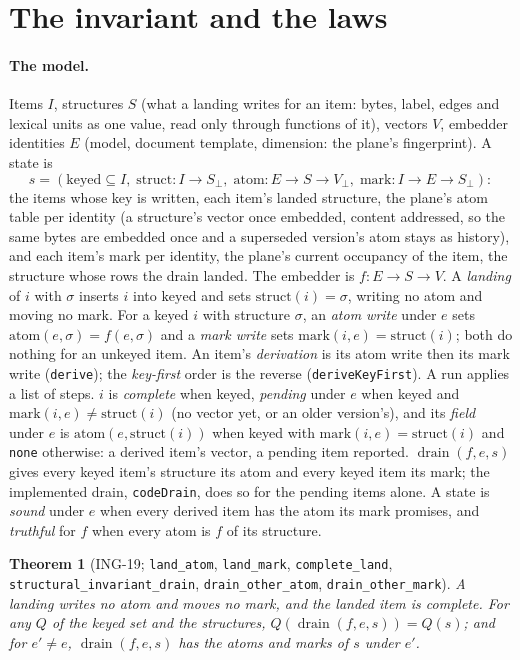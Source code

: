 \documentclass[11pt]{article}
\theoremstyle{plain}
\newtheorem{theorem}{Theorem}[section]
\theoremstyle{definition}
\theoremstyle{remark}
\newcommand{\lean}[1]{\texttt{#1}}
\newcommand{\ing}[1]{ING-#1}
\newcommand{\drain}{\operatorname{drain}}
\begin{document}
\section{The invariant and the laws}\label{sec:theory}

\paragraph{The model.} Items $I$, structures $S$ (what a landing writes for an item: bytes, label,
edges and lexical units as one value, read only through functions of it), vectors $V$, embedder
identities $E$ (model, document template, dimension: the plane's fingerprint). A state is
\[
  s = (\mathrm{keyed} \subseteq I,\;
       \mathrm{struct} : I \to S_\bot,\;
       \mathrm{atom} : E \to S \to V_\bot,\;
       \mathrm{mark} : I \to E \to S_\bot):
\]
the items whose key is written, each item's landed structure, the plane's atom table per identity
(a structure's vector once embedded, content addressed, so the same bytes are embedded once and a
superseded version's atom stays as history), and each item's mark per identity, the plane's current
occupancy of the item, the structure whose rows the drain landed. The embedder is $f : E \to S \to V$.
A \emph{landing} of $i$ with $\sigma$ inserts $i$ into $\mathrm{keyed}$ and sets
$\mathrm{struct}(i) = \sigma$, writing no atom and moving no mark. For a keyed $i$ with structure
$\sigma$, an \emph{atom write} under $e$ sets $\mathrm{atom}(e, \sigma) = f(e, \sigma)$ and a
\emph{mark write} sets $\mathrm{mark}(i, e) = \mathrm{struct}(i)$; both do nothing for an unkeyed
item. An item's \emph{derivation} is its atom write then its mark write (\lean{derive}); the
\emph{key-first} order is the reverse (\lean{deriveKeyFirst}). A run applies a list of steps.
$i$ is \emph{complete} when keyed, \emph{pending} under $e$ when keyed and
$\mathrm{mark}(i, e) \neq \mathrm{struct}(i)$ (no vector yet, or an older version's), and its
\emph{field} under $e$ is $\mathrm{atom}(e, \mathrm{struct}(i))$ when keyed with
$\mathrm{mark}(i, e) = \mathrm{struct}(i)$ and \lean{none} otherwise: a derived item's vector, a
pending item reported. $\drain(f, e, s)$ gives every keyed item's structure its atom and every
keyed item its mark; the implemented drain, \lean{codeDrain}, does so for the pending items alone.
A state is \emph{sound} under $e$ when every derived item has the atom its mark promises, and
\emph{truthful} for $f$ when every atom is $f$ of its structure.

\begin{theorem}[\ing{19}; \lean{land\_atom}, \lean{land\_mark}, \lean{complete\_land},
\lean{structural\_invariant\_drain}, \lean{drain\_other\_atom}, \lean{drain\_other\_mark}]
A landing writes no atom and moves no mark, and the landed item is complete. For any $Q$ of the
keyed set and the structures, $Q(\drain(f, e, s)) = Q(s)$; and for $e' \neq e$, $\drain(f, e, s)$
has the atoms and marks of $s$ under $e'$.
\end{theorem}
\end{document}
